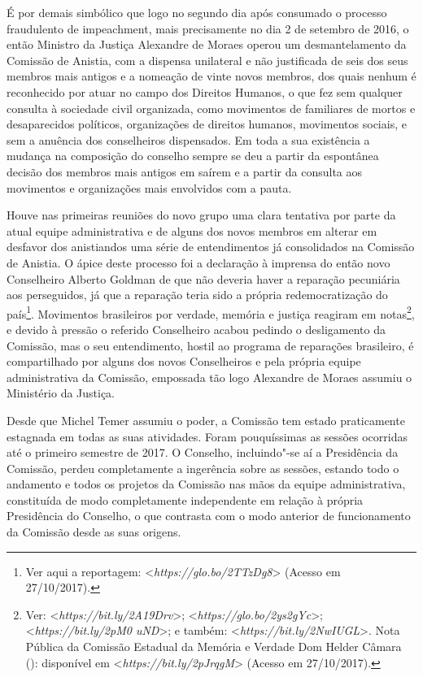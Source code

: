 É por demais simbólico que logo no segundo dia após consumado o processo
fraudulento de impeachment, mais precisamente no dia 2 de setembro de
2016, o então Ministro da Justiça Alexandre de Moraes operou um
desmantelamento da Comissão de Anistia, com a dispensa unilateral e não
justificada de seis dos seus membros mais antigos e a nomeação de vinte
novos membros, dos quais nenhum é reconhecido por atuar no campo dos
Direitos Humanos, o que fez sem qualquer consulta à sociedade civil
organizada, como movimentos de familiares de mortos e desaparecidos
políticos, organizações de direitos humanos, movimentos sociais, e sem a
anuência dos conselheiros dispensados. Em toda a sua existência a
mudança na composição do conselho sempre se deu a partir da espontânea
decisão dos membros mais antigos em saírem e a partir da consulta aos
movimentos e organizações mais envolvidos com a pauta.

Houve nas primeiras reuniões do novo grupo uma clara tentativa por parte
da atual equipe administrativa e de alguns dos novos membros em alterar
em desfavor dos anistiandos uma série de entendimentos já consolidados
na Comissão de Anistia. O ápice deste processo foi a declaração à
imprensa do então novo Conselheiro Alberto Goldman de que não deveria
haver a reparação pecuniária aos perseguidos, já que a reparação teria
sido a própria redemocratização do país\footnote{Ver aqui a reportagem:
  \textless{}\emph{https://glo.bo/2TTzDg8}\textgreater{}
  (Acesso em 27/10/2017).}. Movimentos brasileiros por verdade, memória
e justiça reagiram em notas\footnote{Ver:
  \textless{}\emph{https://bit.ly/2A19Drv}\textgreater{};
  \textless{}\emph{https://glo.bo/2ys2gYc}\textgreater{};
  \textless{}\emph{https://bit.ly/2pM0 uND}\textgreater{};
  e também:
  \textless{}\emph{https://bit.ly/2NwIUGL}\textgreater{}.
  Nota Pública da Comissão Estadual da Memória e Verdade Dom Helder
  Câmara (): disponível em
  \textless{}\emph{https://bit.ly/2pJrqgM}\textgreater{}
  (Acesso em 27/10/2017).}, e devido à pressão o referido Conselheiro
acabou pedindo o desligamento da Comissão, mas o seu entendimento,
hostil ao programa de reparações brasileiro, é compartilhado por alguns
dos novos Conselheiros e pela própria equipe administrativa da Comissão,
empossada tão logo Alexandre de Moraes assumiu o Ministério da Justiça.

Desde que Michel Temer assumiu o poder, a Comissão tem estado
praticamente estagnada em todas as suas atividades. Foram pouquíssimas
as sessões ocorridas até o primeiro semestre de 2017. O Conselho,
incluindo"-se aí a Presidência da Comissão, perdeu completamente a
ingerência sobre as sessões, estando todo o andamento e todos os
projetos da Comissão nas mãos da equipe administrativa, constituída de
modo completamente independente em relação à própria Presidência do
Conselho, o que contrasta com o modo anterior de funcionamento da
Comissão desde as suas origens.

